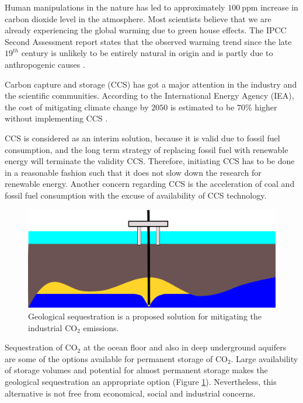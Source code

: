 Human manipulations in the nature has led to approximately $100~\mbox{ppm}$ increase in carbon dioxide level in the atmosphere. Most scientists believe that we are already experiencing the global warming due to green house effects. The IPCC Second Assessment report states that the observed warming trend since the late $19^{th}$ century is unlikely to be entirely natural in origin and is partly due to anthropogenic causes \cite{change1995ipcc}. 

Carbon capture and storage (CCS) has got a major attention in the industry and the scientific communities. According to the International Energy Agency (IEA), the cost of mitigating climate change by $2050$ is estimated to be $70\%$ higher without implementing CCS \cite{iaeScenario}.

CCS is considered as an interim solution, because it is valid due to fossil fuel consumption, and the long term strategy of replacing fossil fuel with renewable energy will terminate the validity CCS. Therefore, initiating CCS has to be done in a reasonable fashion such that it does not slow down the research for renewable energy. Another concern regarding CCS is the acceleration of coal and fossil fuel consumption with the excuse of availability of CCS technology.

\begin{figure}
  \centering
  \includegraphics[width=0.65 \linewidth]{./figurer/platform} 
  \caption{Geological sequestration is a proposed solution for mitigating the
industrial $\mbox{CO}_2$ emissions.}
  \label{fig:platform}
%
\end{figure}


Sequestration of CO$_2$ at the ocean floor and also in deep underground aquifers are some of the options available for permanent storage of $\mbox{CO}_2$. Large availability of storage volumes and potential for almost permanent storage makes the geological sequestration an appropriate option (Figure \ref{fig:platform}). Nevertheless, this alternative is not free from economical, social and industrial concerns.  

